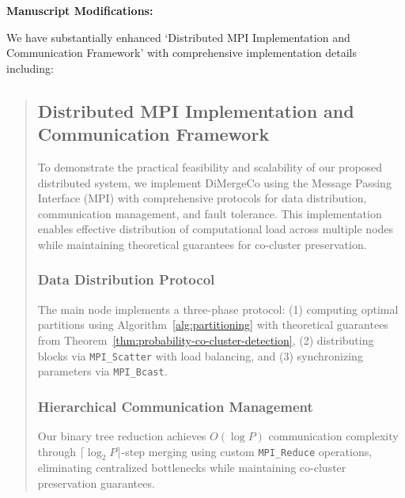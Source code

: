 \documentclass{ar2rc}
\begin{document}
\textbf{Manuscript Modifications:}

We have substantially enhanced  `Distributed MPI Implementation and Communication Framework' with comprehensive implementation details including:

\begin{quote}
  \subsection*{ Distributed MPI Implementation and Communication Framework}
  To demonstrate the practical feasibility and scalability of our proposed distributed system, we implement DiMergeCo using the Message Passing Interface (MPI) with comprehensive protocols for data distribution, communication management, and fault tolerance. This implementation enables effective distribution of computational load across multiple nodes while maintaining theoretical guarantees for co-cluster preservation.
  \subsubsection*{ Data Distribution Protocol}
  The main node implements a three-phase protocol: (1) computing optimal partitions using Algorithm~\ref{alg:partitioning} with theoretical guarantees from Theorem~\ref{thm:probability-co-cluster-detection}, (2) distributing blocks via \texttt{MPI\_Scatter} with load balancing, and (3) synchronizing parameters via \texttt{MPI\_Bcast}.

  \subsubsection*{ Hierarchical Communication Management}
  Our binary tree reduction achieves $O(\log P)$ communication complexity through $\lceil \log_2 P \rceil$-step merging using custom \texttt{MPI\_Reduce} operations, eliminating centralized bottlenecks while maintaining co-cluster preservation guarantees.
\end{quote}


\end{document}
